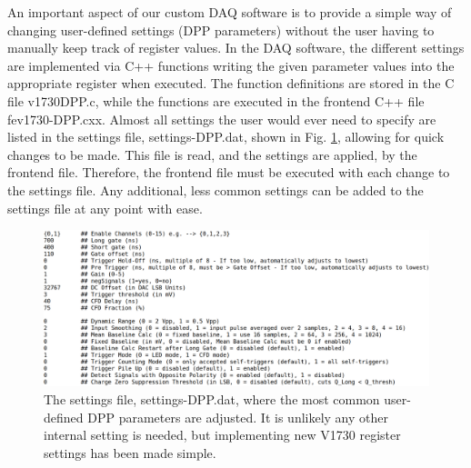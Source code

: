 
An important aspect of our custom DAQ software is to provide a simple way of changing user-defined settings (DPP parameters) without the user having to manually keep track of register values. In the DAQ software, the different settings are implemented via C++ functions writing the given parameter values into the appropriate register when executed. The function definitions are stored in the C file v1730DPP.c, while the functions are executed in the frontend C++ file fev1730-DPP.cxx. Almost all settings the user would ever need to specify are listed in the settings file, settings-DPP.dat, shown in Fig. \ref{fig:settings_file}, allowing for quick changes to be made. This file is read, and the settings are applied, by the frontend file. Therefore, the frontend file must be executed with each change to the settings file. Any additional, less common settings can be added to the settings file at any point with ease.

\begin{figure}[t]
\centering
\includegraphics[width=6.5in]{Chapter-5/figs/settings_file4.png}
\caption{\label{fig:settings_file}The settings file, settings-DPP.dat, where the most common user-defined DPP parameters are adjusted. It is unlikely any other internal setting is needed, but implementing new V1730 register settings has been made simple.}
\end{figure}



